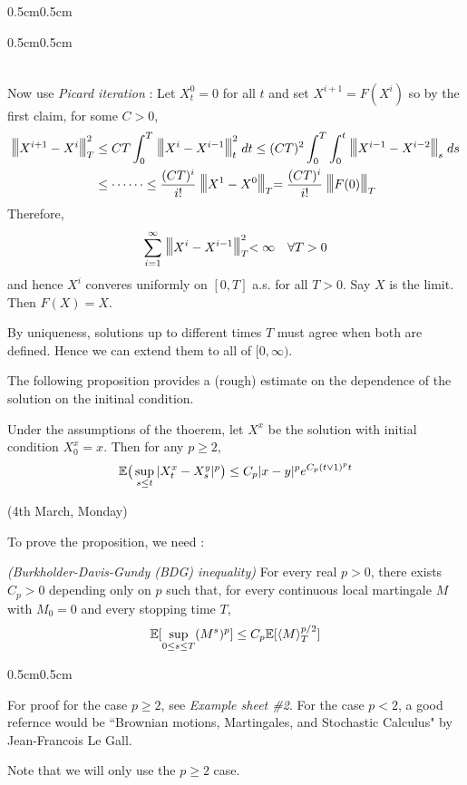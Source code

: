 \documentclass[12pt,a4paper]{article}
\newenvironment{proof}
{\begin{changemargin}{0.5cm}{0.5cm} 
	}%
	{\end{changemargin}
}
\newenvironment{subproof}
{\begin{changemargin}{0.5cm}{0.5cm} 
	}%
	{\end{changemargin}
}
\newenvironment{p}
{\begin{proof} 
	}%
	{\end{proof}
}
\begin{document}
\begin{p}
\begin{subproof}
\begin{align*}
\end{align*}
\end{subproof}
Now use \emph{Picard iteration} : Let $X_t^0 = 0$ for all $t$ and set $X^{i+1} = F(X^i)$ so by the first claim, for some $C>0$,
\begin{align*}
\tnorms{X^{i+1} - X^i}{T}^2 &\leq CT \int_0^T \tnorms{X^{i} - X^{i-1}}{t}^2 dt \leq (CT)^2 \int_0^T \int_0^t \tnorms{X^{i-1} - X^{i-2}}{s} ds \\
&\leq \cdots\cdots \leq \frac{(CT)^i}{i!} \tnorms{X^1 - X^0}{T} = \frac{(CT)^i}{i!} \tnorms{F(0)}{T} 
\end{align*}
Therefore,
\begin{align*}
\sum_{i=1}^{\infty} \tnorms{X^i - X^{i-1}}{T}^2 < \infty \quad \forall T>0
\end{align*}
and hence $X^i$ converes uniformly on $[0, T]$ a.s. for all $T>0$. Say $X$ is the limit. Then $F(X)=X$.
\s

By uniqueness, solutions up to different times $T$ must agree when both are defined. Hence we can extend them to all of $[0, \infty)$. 

\eop
\end{p}
\s

The following proposition provides a (rough) estimate on the dependence of the solution on the initinal condition.
\s

\prop Under the assumptions of the thoerem, let $X^{x}$ be the solution with initial condition $X_0^x =x$. Then for any $p\geq 2$,
\begin{align*}
\mathbb{E} \big( \sup_{s\leq t} |X_t^x - X_s^y|^p \big) \leq C_p |x-y|^p e^{C_p (t\vee 1)^p t}
\end{align*}

\newday

(4th March, Monday)
\s

To prove the proposition, we need :
\s

\lem \emph{(Burkholder-Davis-Gundy (BDG) inequality)} For every real $p>0$, there exists $C_p>0$ depending only on $p$ such that, for every continuous local martingale $M$ with $M_0 =0$ and every stopping time $T$,
\begin{align*}
\mathbb{E} [\sup_{0\leq s\leq T}(M^s)^p] \leq C_p \mathbb{E} [ \langle M \rangle_T^{p/2}]
\end{align*}
\begin{p}
For proof for the case $p\geq 2$, see \emph{Example sheet \#2}. For the case $p< 2$, a good refernce would be ``Brownian motions, Martingales, and Stochastic Calculus" by Jean-Francois Le Gall.

\quad Note that we will only use the $p\geq 2$ case.
\end{p}
\s
\end{document}
